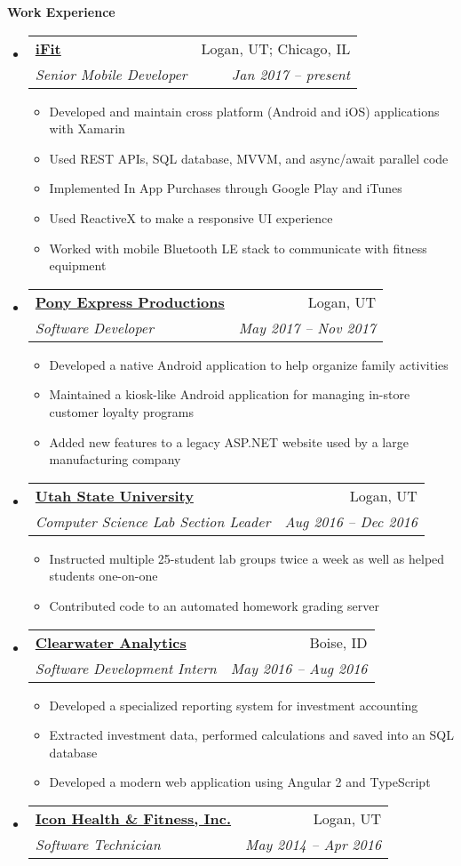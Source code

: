 \documentclass[letterpaper,11pt]{article}
\makeatletter
\newcommand{\resitem}[1]{\item #1 \vspace{-2pt}}
\newcommand{\resheading}[1]{{\large \colorbox{mygrey}{\begin{minipage}{\textwidth}{\textbf{#1 \vphantom{p\^{E}}}}\end{minipage}}}}
\newcommand{\ressubheading}[4]{
\begin{tabular*}{6.5in}{l@{\extracolsep{\fill}}r}
		\textbf{#1} & #2 \\
		\textit{#3} & \textit{#4} \\
\end{tabular*}\vspace{-6pt}}
\makeatother
\begin{document}
\resheading{Work Experience}
	\begin{itemize}
		\item 
		\ressubheading{\href{http://www.ifit.com}{iFit}}{Logan, UT; Chicago, IL}{Senior Mobile Developer}{Jan 2017 -- present}
		{ \footnotesize
			\begin{itemize}
				\resitem{Developed and maintain cross platform (Android and iOS) applications with Xamarin}
				\resitem{Used REST APIs, SQL database, MVVM, and async/await parallel code}
				\resitem{Implemented In App Purchases through Google Play and iTunes}
				\resitem{Used ReactiveX to make a responsive UI experience}
				\resitem{Worked with mobile Bluetooth LE stack to communicate with fitness equipment}
			\end{itemize}
		}
		\item 
		\ressubheading{\href{http://www.pxp200.com}{Pony Express Productions}}{Logan, UT}{Software Developer}{May 2017 -- Nov 2017}
		{ \footnotesize
			\begin{itemize}
				\resitem{Developed a native Android application to help organize family activities}
				\resitem{Maintained a kiosk-like Android application for managing in-store customer loyalty programs}
				\resitem{Added new features to a legacy ASP.NET website used by a large manufacturing company}
			\end{itemize}
		}
		\item 
		\ressubheading{\href{http://www.cs.usu.edu}{Utah State University}}{Logan, UT}{Computer Science Lab Section Leader}{Aug 2016 -- Dec 2016}
		{ \footnotesize
			\begin{itemize}
				\resitem{Instructed multiple 25-student lab groups twice a week as well as helped students one-on-one}
				\resitem{Contributed code to an automated homework grading server}
			\end{itemize}
		}
		\item 
		\ressubheading{\href{http://www.clearwateranalytics.com}{Clearwater Analytics}}{Boise, ID}{Software Development Intern}{May 2016 -- Aug 2016}
		{ \footnotesize
			\begin{itemize}
				\resitem{Developed a specialized reporting system for investment accounting}
				\resitem{Extracted investment data, performed calculations and saved into an SQL database}
				\resitem{Developed a modern web application using Angular 2 and TypeScript}
			\end{itemize}
		}
		\item 
			\ressubheading{\href{http://www.iconhealthandfitness.com}{Icon Health \& Fitness, Inc.}}{Logan, UT}{Software Technician}{May 2014 -- Apr 2016}

\end{itemize}
\end{document}
